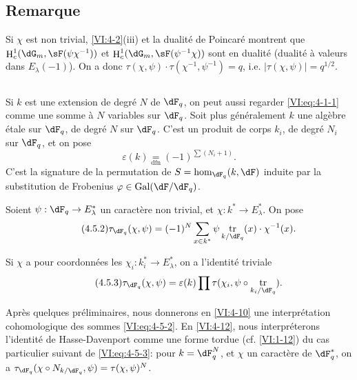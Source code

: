 \documentclass[oneside]{book}
\DeclareMathOperator{\gal}{Gal}
\DeclareMathOperator{\h}{H}
\DeclareMathOperator{\tr}{tr}
\theoremstyle{sga-source}
\theoremstyle{sga-source-dash}
\theoremstyle{sga-source-dotdash}
\theoremstyle{sga-source-number-note-dash}
\theoremstyle{sga-source-note-number-dotdash}
\theoremstyle{sga-source-example-dotdash}
\theoremstyle{sga-source-inline-number}
\theoremstyle{sga-source-bare-number}
\theoremstyle{sga-source}
\newcommand{\PrintPage}[1]{}\newcommand{\MathPage}[1]{}\newcommand{\PrintCite}[2]{#1}\newcommand{\var}[3]{#2}
\begin{document}
\subsection{Remarque}\label{VI:4-4}

Si $\chi$ est non trivial, \ref{VI:4-2}(iii) et la dualité de Poincaré 
montrent que $\h_c^1(\dG_m,\sF(\psi\chi^{-1}))$ et 
$\h_c^1(\dG_m,\sF(\psi^{-1}\chi))$ sont en dualité (dualité à valeurs 
dans $E_\lambda(-1)$). On a donc 
$\tau(\chi,\psi)\cdot \tau(\chi^{-1},\psi^{-1}) = q$, i.e. 
$\var{|\tau(\chi,\psi)|=q}{|\tau(\chi,\psi)|=q^{1/2}}{S45-SOL-0805}$. 





\subsection{}\label{VI:4-5}

Si $k$ est une extension de degré $N$ de $\dF_q$, on peut aussi regarder 
\eqref{VI:eq:4-1-1} comme une somme à $N$ variables sur $\dF_q$. Soit plus 
généralement $k$ une algèbre étale sur $\dF_q$, de degré $N$ sur 
$\dF_q$. C'est \var{un produits de corps}{un produit de corps}{S45-SOL-0806} $k_i$, de degré $N_i$ sur $\dF_q$, et on pose 
\begin{equation*}\tag{4.5.1}\label{VI:eq:4-5-1}
  \varepsilon(k) \underset{\mathrm{dfn}}{=} (-1)^{\sum (N_i+1)} \text{.} 
\end{equation*}
C'est la signature de la permutation de $S=\hom_{\dF_q}(k,\dF)$ induite par la 
substitution de Frobenius $\varphi\in \gal(\dF/\dF_q)$. 

Soient $\psi:\dF_q\to E_\lambda^\ast$ un caractère non trivial, et 
$\chi:k^\ast \to E_\lambda^\ast$. On pose 
\begin{equation*}\tag{4.5.2}\label{VI:eq:4-5-2}
  \tau_{\dF_q}(\chi,\psi) = (-1)^N \sum_{x\in k^\ast} \psi \tr_{k/\dF_q}(x) \cdot \chi^{-1}(x) \text{.} 
\end{equation*}

Si $\chi$ a pour coordonnées les $\chi_i:k_i^\ast \to E_\lambda^\ast$, on 
a l'identité triviale 
\begin{equation*}\tag{4.5.3}\label{VI:eq:4-5-3}
  \tau_{\dF_q}(\chi,\psi) = \varepsilon(k) \prod \tau(\chi_i,\psi\circ \tr_{k_i/\dF_q}) \text{.}
\end{equation*}

\PrintPage{198}
Après quelques préliminaires, nous donnerons en \ref{VI:4-10} une 
interprétation cohomologique des sommes \eqref{VI:eq:4-5-2}. En 
\ref{VI:4-12}, nous interpréterons l'identité de Hasse-Davenport comme une 
forme tordue (cf. \ref{VI:1-12}) du cas particulier suivant de 
\eqref{VI:eq:4-5-3}: pour $k=\dF_q^N$, et $\chi$ un caractère de 
$\dF_q^\ast$, on a 
$\tau_{\dF_q}(\chi\circ N_{k/\dF_q},\psi)=\tau(\chi,\psi)^N$. 
\end{document}
